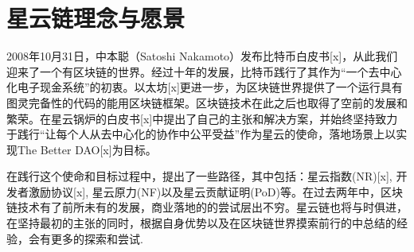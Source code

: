 \section{星云链理念与愿景}

2008年10⽉31⽇，中本聪（Satoshi Nakamoto）发布⽐特币⽩⽪书[x]，从此我们迎来了⼀个有区块链的世界。经过十年的发展，⽐特币践⾏了其作为“⼀个去中⼼化电⼦现⾦系统”的初衷。以太坊[x]更进一步，为区块链世界提供了一个运行具有图灵完备性的代码的能用区块链框架。区块链技术在此之后也取得了空前的发展和繁荣。在星云锅炉的白皮书[x]中提出了自己的主张和解决方案，并始终坚持致力于践行“让每个人从去中心化的协作中公平受益”作为星云的使命，落地场景上以实现The Better DAO[x]为目标。

在践行这个使命和目标过程中，提出了一些路径，其中包括：星云指数(NR)[x], 开发者激励协议[x], 星云原力(NF)以及星云贡献证明(PoD)等。在过去两年中，区块链技术有了前所未有的发展，商业落地的的尝试层出不穷。星云链也将与时俱进，在坚持最初的主张的同时，根据自身优势以及在区块链世界摸索前行的中总结的经验，会有更多的探索和尝试.
